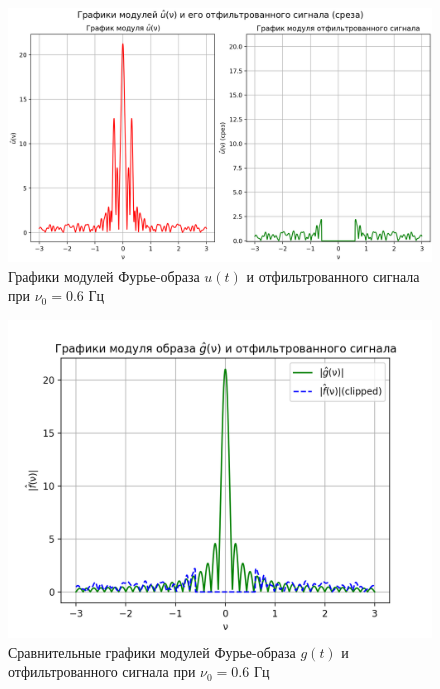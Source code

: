 \begin{figure}[ht!]
    \centering
    \includegraphics[scale=0.55]{media/1 task/low_freq/Fourier_Image_4_2_2-0,5975975975975976.png}
    \caption{Графики модулей Фурье-образа $u(t)$ и отфильтрованного сигнала при $\nu_0=0.6$ Гц}
    \label{fig:four_4_2_2_0.6}
\end{figure}

\begin{figure}[ht!]
    \centering
    \includegraphics[scale=0.55]{media/1 task/low_freq/Fourier_Image_Comparison_4_2_2-0,5975975975975976.png}
    \caption{Сравнительные графики модулей Фурье-образа $g(t)$ и отфильтрованного сигнала при $\nu_0=0.6$ Гц}
    \label{fig:fourc_4_2_2_0.6}
\end{figure}

